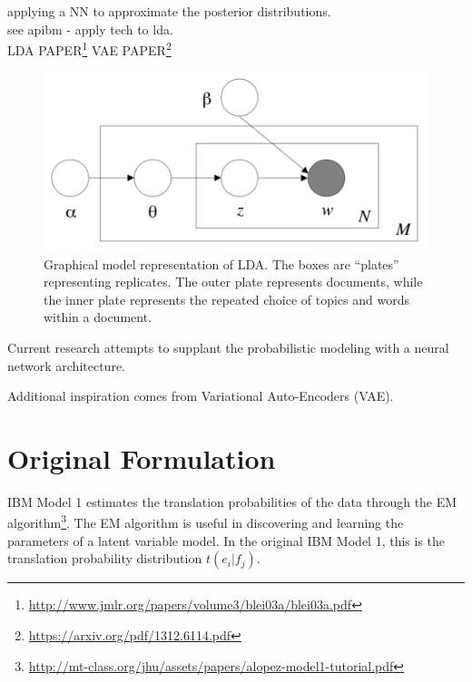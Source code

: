 \documentclass[twoside,twocolumn]{article}
\begin{document}
applying a NN to approximate the posterior distributions.\\
see apibm - apply tech to lda.\\
LDA PAPER\footnote{\url{http://www.jmlr.org/papers/volume3/blei03a/blei03a.pdf}}
VAE PAPER\footnote{\url{https://arxiv.org/pdf/1312.6114.pdf}} 

\begin{figure}
\centering
\includegraphics[scale=0.5]{LDADiagram}
\caption{Graphical model representation of LDA. The boxes are “plates” representing replicates. The outer plate represents documents, while the inner plate represents the repeated choice of topics and words within a document. }
\end{figure}

Current research attempts to supplant the probabilistic modeling with a neural network architecture. 

Additional inspiration comes from Variational Auto-Encoders (VAE).

\section{Original Formulation}

IBM Model 1 estimates the translation probabilities of the data through the EM algorithm\footnote{\url{http://mt-class.org/jhu/assets/papers/alopez-model1-tutorial.pdf}}. The EM algorithm is useful in discovering and learning the parameters of a latent variable model. In the original IBM Model 1, this is the translation probability distribution $t(e_i|f_j)$.
\end{document}
